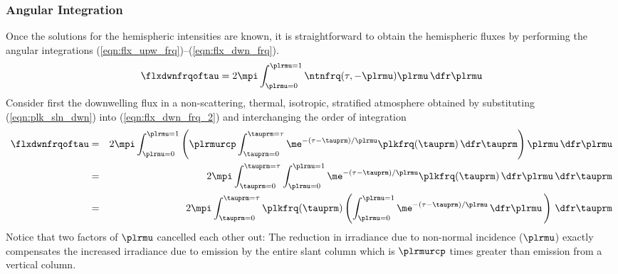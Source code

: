 \documentclass[12pt]{article}
\begin{document}
\subsubsection[Angular Integration]{Angular Integration}\label{sxn:ngl}
Once the solutions for the hemispheric intensities are known, it is
straightforward to obtain the hemispheric fluxes by performing the
angular integrations (\ref{eqn:flx_upw_frq})--(\ref{eqn:flx_dwn_frq}).
\begin{equation}
\flxdwnfrqoftau = 2 \mpi \int_{\plrmu=0}^{\plrmu=1} \ntnfrq
(\tau,-\plrmu) \plrmu \,\dfr\plrmu
\label{eqn:flx_dwn_frq_2}
\end{equation}
Consider first the downwelling flux in a non-scattering, thermal,
isotropic, stratified atmosphere obtained by substituting
(\ref{eqn:plk_sln_dwn}) into (\ref{eqn:flx_dwn_frq_2})
and interchanging the order of integration
\begin{eqnarray}
\flxdwnfrqoftau & = & 2 \mpi \int_{\plrmu=0}^{\plrmu=1}
\left( \plrmurcp \int_{\tauprm = 0}^{\tauprm = \tau} 
\me^{-(\tau - \tauprm)/\plrmu} \plkfrq(\tauprm) \,\dfr\tauprm 
\right) \plrmu \,\dfr\plrmu \nonumber \\
& = & 2 \mpi \int_{\tauprm = 0}^{\tauprm = \tau} 
\int_{\plrmu=0}^{\plrmu=1}
\me^{-(\tau - \tauprm)/\plrmu} \plkfrq(\tauprm) \,\dfr\plrmu \,\dfr\tauprm
\nonumber \\ 
& = & 2 \mpi \int_{\tauprm = 0}^{\tauprm = \tau} 
\plkfrq(\tauprm) \left(
\int_{\plrmu = 0}^{\plrmu = 1}
\me^{-(\tau - \tauprm)/\plrmu} \,\dfr\plrmu \, \right) \,\dfr\tauprm
\label{eqn:flx_dwn_frq_tau}
\end{eqnarray}
Notice that two factors of $\plrmu$ cancelled each other out:
The reduction in irradiance due to non-normal incidence ($\plrmu$)
exactly compensates the increased irradiance due to emission by the
entire slant column which is $\plrmurcp$ times greater than emission
from a vertical column.
\end{document}
